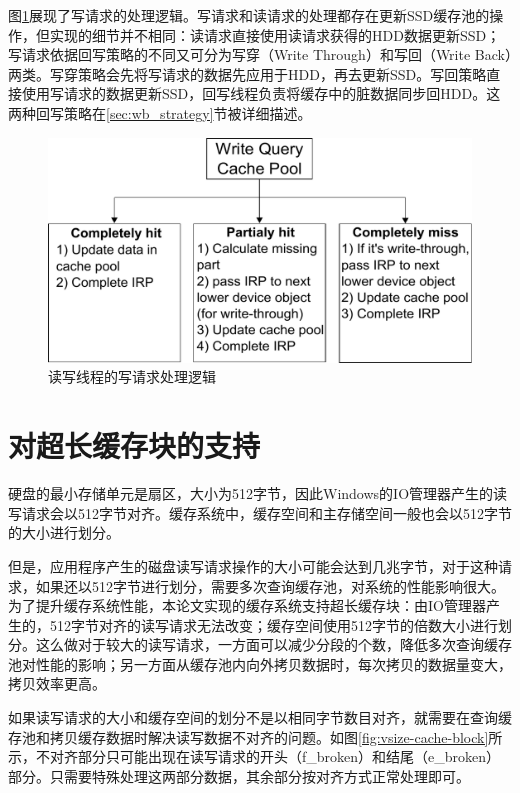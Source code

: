图\ref{fig:df-proc-write}展现了写请求的处理逻辑。写请求和读请求的处理都存在更新SSD缓存池的操作，但实现的细节并不相同：读请求直接使用读请求获得的HDD数据更新SSD；写请求依据回写策略的不同又可分为写穿（Write Through）和写回（Write Back）两类。写穿策略会先将写请求的数据先应用于HDD，再去更新SSD。写回策略直接使用写请求的数据更新SSD，回写线程负责将缓存中的脏数据同步回HDD。这两种回写策略在\ref{sec:wb_strategy}节被详细描述。

\begin{figure}[!ht]
\centering
\includegraphics[width=0.8\linewidth]{./graph/df-proc-write}
\caption{读写线程的写请求处理逻辑}
\label{fig:df-proc-write}
\end{figure}


\section{对超长缓存块的支持}

硬盘的最小存储单元是扇区，大小为512字节，因此Windows的IO管理器产生的读写请求会以512字节对齐。缓存系统中，缓存空间和主存储空间一般也会以512字节的大小进行划分。

但是，应用程序产生的磁盘读写请求操作的大小可能会达到几兆字节，对于这种请求，如果还以512字节进行划分，需要多次查询缓存池，对系统的性能影响很大。为了提升缓存系统性能，本论文实现的缓存系统支持超长缓存块：由IO管理器产生的，512字节对齐的读写请求无法改变；缓存空间使用512字节的倍数大小进行划分。这么做对于较大的读写请求，一方面可以减少分段的个数，降低多次查询缓存池对性能的影响；另一方面从缓存池内向外拷贝数据时，每次拷贝的数据量变大，拷贝效率更高。

如果读写请求的大小和缓存空间的划分不是以相同字节数目对齐，就需要在查询缓存池和拷贝缓存数据时解决读写数据不对齐的问题。如图\ref{fig:vsize-cache-block}所示，不对齐部分只可能出现在读写请求的开头（f\_broken）和结尾（e\_broken）部分。只需要特殊处理这两部分数据，其余部分按对齐方式正常处理即可。

